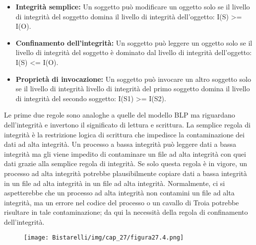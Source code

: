 \begin{itemize}
    \item \textbf{Integrità semplice:} Un soggetto può modificare un oggetto solo se il livello di integrità del soggetto domina il livello di integrità dell'oggetto: I(S) >= I(O).
    
    \item \textbf{Confinamento dell'integrità:} Un soggetto può leggere un oggetto solo se il livello di integrità del soggetto è dominato dal livello di integrità dell'oggetto: I(S) <= I(O).
    
    \item \textbf{Proprietà di invocazione:} Un soggetto può invocare un altro soggetto solo se il livello di integrità livello di integrità del primo soggetto domina il livello di integrità del secondo soggetto: I(S1) >= I(S2).

\end{itemize}
Le prime due regole sono analoghe a quelle del modello BLP ma riguardano dell'integrità e invertono il significato di lettura e scrittura. La semplice regola di integrità è la restrizione logica di scrittura che impedisce la contaminazione dei dati ad alta integrità.
Un processo a bassa integrità può leggere dati a bassa integrità ma gli viene impedito di contaminare un file ad alta integrità con quei dati grazie alla semplice regola di integrità. Se solo questa regola è in vigore, un processo ad alta integrità potrebbe plausibilmente copiare dati a bassa integrità in un file ad alta integrità in un file ad alta integrità. Normalmente, ci si aspetterebbe che un processo ad alta integrità non contamini un file ad alta integrità, ma un errore nel codice del processo o un cavallo di Troia potrebbe risultare in tale contaminazione; da qui la necessità della regola di confinamento dell'integrità.

\begin{figure}[H]
	\centering
    \texttt{[image: Bistarelli/img/cap\_27/figura27.4.png]}
\end{figure}

